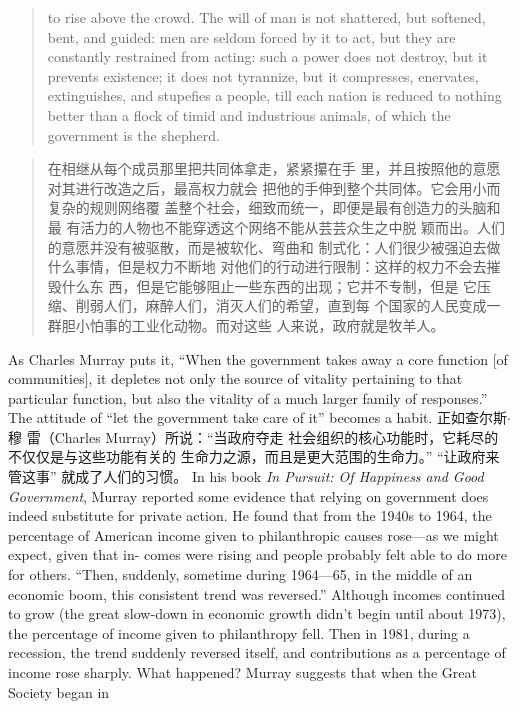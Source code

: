 \begin{paracol}{2}
\begin{quote}
to rise above the crowd. The will of man is not shattered, but
softened, bent, and guided: men are seldom forced by it to act,
but they are constantly restrained from acting: such a power
does not destroy, but it prevents existence; it does not tyrannize,
but it compresses, enervates, extinguishes, and stupefies a people, till each nation is reduced to nothing better than a flock of
timid and industrious animals, of which the government is the
shepherd.
\end{quote}
\switchcolumn
\begin{quote}
在相继从每个成员那里把共同体拿走，紧紧攥在手
里，并且按照他的意愿对其进行改造之后，最高权力就会
把他的手伸到整个共同体。它会用小而复杂的规则网络覆
盖整个社会，细致而统一，即便是最有创造力的头脑和最
有活力的人物也不能穿透这个网络不能从芸芸众生之中脱
颖而出。人们的意愿并没有被驱散，而是被软化、弯曲和
制式化：人们很少被强迫去做什么事情，但是权力不断地
对他们的行动进行限制：这样的权力不会去摧毁什么东
西，但是它能够阻止一些东西的出现；它并不专制，但是
它压缩、削弱人们，麻醉人们，消灭人们的希望，直到每
个国家的人民变成一群胆小怕事的工业化动物。而对这些
人来说，政府就是牧羊人。
\end{quote}
\switchcolumn*
As Charles Murray puts it, ``When the government takes
away a core function [of communities], it depletes not only the
source of vitality pertaining to that particular function, but also
the vitality of a much larger family of responses.'' The attitude
of ``let the government take care of it'' becomes a habit.
\switchcolumn
正如查尔斯$\cdot$ 穆 雷（Charles  Murray）所说：“当政府夺走
社会组织的核心功能时，它耗尽的不仅仅是与这些功能有关的
生命力之源，而且是更大范围的生命力。” “让政府来管这事”
就成了人们的习惯。
\switchcolumn*
In his book \textit{In Pursuit: Of Happiness and Good Government},
Murray reported some evidence that relying on government
does indeed substitute for private action. He found that from
the 1940s to 1964, the percentage of American income given to
philanthropic causes rose---as we might expect, given that in-
comes were rising and people probably felt able to do more for
others. ``Then, suddenly, sometime during 1964---65, in the
middle of an economic boom, this consistent trend was reversed.'' Although incomes continued to grow (the great slow-down in economic growth didn't begin until about 1973), the
percentage of income given to philanthropy fell. Then in 1981,
during a recession, the trend suddenly reversed itself, and contributions as a percentage of income rose sharply. What happened? Murray suggests that when the Great Society began in

\end{paracol}
